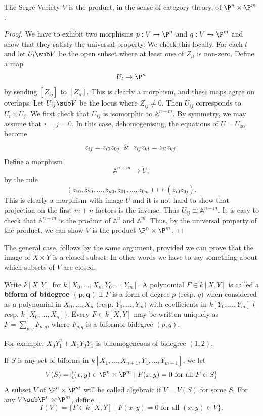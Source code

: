 \begin{proposition}
The Segre Variety $V$ is the product, in the sense of category theory, of $\P^n\times\P^m$.
\end{proposition}
\begin{proof}
We have to exhibit two morphisms $p:V\to\P^n$ and $q:V\to\P^m$ and show that they satisfy the universal property. We check this locally. For each $l$ and let $U_l\sub V$ be the open subset where at least one of $Z_{il}$ is non-zero. Define a map
\[U_l\to\P^n\]
by sending $[Z_{ij}]$ to $[Z_{il}]$. This is clearly a morphism, and these maps agree on overlaps. Let $U_{ij}\sub V$ be the locus where $Z_{ij}\neq0$. Then $U_{ij}$ corresponds to $U_i\times U_j$. We first check that $U_{ij}$ is isomorphic to $\mathbb{A}^{n+m}$. By symmetry, we may assume that $i=j=0$. In this case, dehomogenising, the equations of $U=U_{00}$ become
\[z_{ij}=z_{i0}z_{0j}\And z_{ij}z_{kl}=z_{il}z_{kj}.\]
Define a morphism
\[\mathbb{A}^{n+m}\to U,\]
by the rule
\[(z_{10},z_{20},\dots,z_{n0},z_{01},\dots,z_{0m})\mapsto(z_{i0}z_{0j}).\]
This is clearly a morphism with image $U$ and it is not hard to show that projection on the first $m+n$ factors is the inverse. Thus $U_{ij}\cong \mathbb{A}^{n+m}$. It is easy to check that $\mathbb{A}^{n+m}$ is the product of $\mathbb{A}^n$ and $\mathbb{A}^m$. Thus, by the universal property of the product, we can show $V$ is the product $\P^n\times\P^m$.
\end{proof}
The general case, follows by the same argument, provided we can prove that the image of $X\times Y$ is a closed subset. In other words we
have to say something about which subsets of $V$ are closed.
\begin{definition}
Write $k[X,Y]$ for $k[X_0,\dots,X_{n},Y_0,\dots,Y_{m}]$. A polynomial $F\in k[X,Y]$ is called a \textbf{biform of bidegree $\bm{(p,q)}$} if $F$ is a form of degree $p$ $($resp. $q$$)$ when considered as a polynomial in $X_0,\dots,X_{n}$ $($resp. $Y_0,\dots,Y_{m}$$)$ with coefficients in $k[Y_0,\dots,Y_{m}]$ $($resp. $k[X_0,\dots,X_{n}]$$)$. Every $F\in k[X,Y]$ may be written uniquely as $F=\sum_{p,q}F_{p,q}$, where $F_{p,q}$ is a biformof bidegree $(p,q)$.
\end{definition}
For example, $X_0Y_1^2+X_1Y_0Y_1$ is bihomogeneous of bidegree $(1,2)$.
\begin{definition}
If $S$ is any set of biforms in $k[X_1,\dots,X_{n+1},Y_1,\dots,Y_{m+1}]$, we let 
\[V(S)=\{(x,y)\in\P^{n}\times\P^m\mid F(x,y)=0\text{ for all $F\in S$}\}\]
A subset $V$ of $\P^n\times\P^m$ will be called algebraic if $V=V(S)$ for some $S$. For any $V\sub\P^n\times\P^m$, define 
\[I(V)=\{F\in k[X,Y]\mid F(x,y)=0\text{ for all $(x,y)\in V$}\}.\]
\end{definition}
